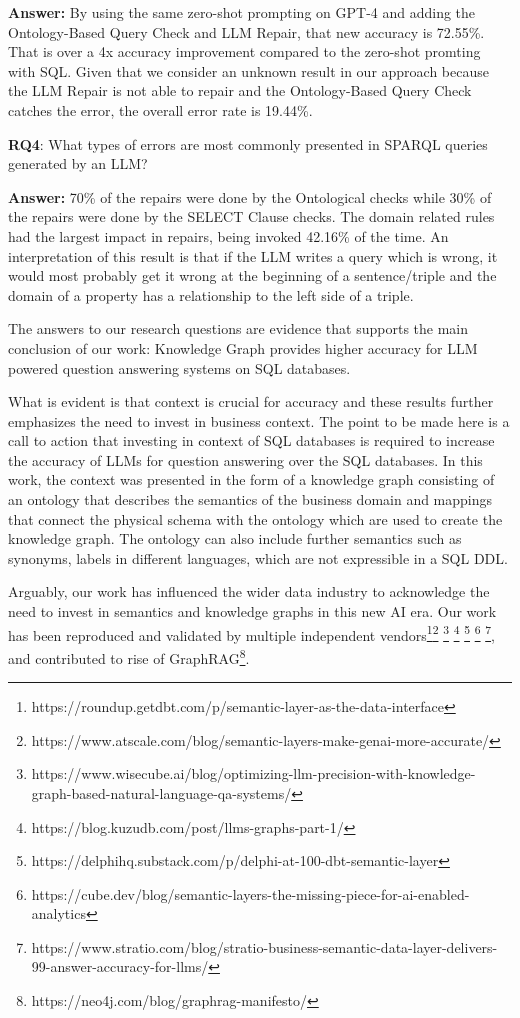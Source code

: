 \documentclass[11pt]{article}
\begin{document}
\textbf{Answer:} By using the same zero-shot prompting on GPT-4 and adding the Ontology-Based Query Check and LLM Repair, that new accuracy is 72.55\%.
That is over a 4x accuracy improvement compared to the zero-shot promting with SQL. 
Given that we consider an unknown result in our approach because the LLM Repair is not able to repair and the Ontology-Based Query Check catches the error, the overall error rate is 19.44\%. 

    
\noindent\textbf{RQ4}: What types of errors are most commonly presented in SPARQL queries generated by an LLM?

\textbf{Answer:} 70\% of the repairs were done by the Ontological checks while 30\% of the repairs were done by the SELECT Clause checks. 
The domain related rules had the largest impact in repairs, being invoked 42.16\% of the time. 
An interpretation of this result is that if the LLM writes a query which is wrong, it would most probably get it wrong at the beginning of a sentence/triple and the domain of a property has a relationship to the left side of a triple.

The answers to our research questions are evidence that supports the main conclusion of our work: Knowledge Graph provides higher accuracy for LLM powered question answering systems on SQL databases.

What is evident is that context is crucial for accuracy and these results further emphasizes the need to invest in business context. 
The point to be made here is a call to action that investing in context of SQL databases is required to increase the accuracy of LLMs for question answering over the SQL databases. 
In this work, the context was presented in the form of a knowledge graph consisting of an ontology that describes the semantics of the business domain and mappings that connect the physical schema with the ontology which are used to create the knowledge graph. 
The ontology can also include further semantics such as synonyms, labels in different languages, which are not expressible in a SQL DDL. 

Arguably, our work has influenced the wider data industry to acknowledge the need to invest in semantics and knowledge graphs in this new AI era. 
Our work has been reproduced and validated by multiple independent vendors\footnote{https://roundup.getdbt.com/p/semantic-layer-as-the-data-interface}\footnote{https://www.atscale.com/blog/semantic-layers-make-genai-more-accurate/}
\footnote{https://www.wisecube.ai/blog/optimizing-llm-precision-with-knowledge-graph-based-natural-language-qa-systems/}
\footnote{https://blog.kuzudb.com/post/llms-graphs-part-1/}
\footnote{https://delphihq.substack.com/p/delphi-at-100-dbt-semantic-layer}
\footnote{https://cube.dev/blog/semantic-layers-the-missing-piece-for-ai-enabled-analytics}
\footnote{https://www.stratio.com/blog/stratio-business-semantic-data-layer-delivers-99-answer-accuracy-for-llms/}, and contributed to rise of GraphRAG\footnote{https://neo4j.com/blog/graphrag-manifesto/}.
\end{document}
